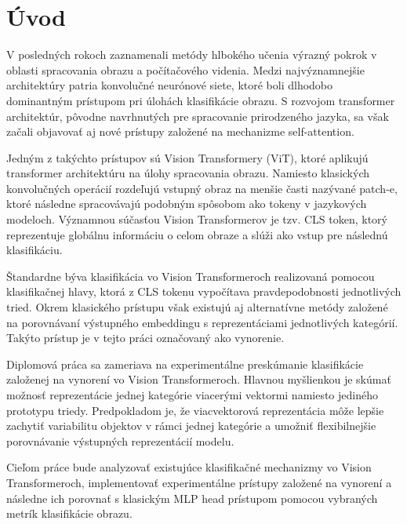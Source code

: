 \chapter*{Úvod} %

V posledných rokoch zaznamenali metódy hlbokého učenia výrazný pokrok v oblasti spracovania obrazu a počítačového videnia. Medzi najvýznamnejšie architektúry patria konvolučné neurónové siete, ktoré boli dlhodobo dominantným prístupom pri úlohách klasifikácie obrazu. S rozvojom transformer architektúr, pôvodne navrhnutých pre spracovanie prirodzeného jazyka, sa však začali objavovať aj nové prístupy založené na mechanizme self-attention.

Jedným z takýchto prístupov sú Vision Transformery (ViT), ktoré aplikujú transformer architektúru na úlohy spracovania obrazu. Namiesto klasických konvolučných operácií rozdeľujú vstupný obraz na menšie časti nazývané patch-e, ktoré následne spracovávajú podobným spôsobom ako tokeny v jazykových modeloch. Významnou súčasťou Vision Transformerov je tzv. CLS token, ktorý reprezentuje globálnu informáciu o celom obraze a slúži ako vstup pre následnú klasifikáciu.

Štandardne býva klasifikácia vo Vision Transformeroch realizovaná pomocou klasifikačnej hlavy, ktorá z CLS tokenu vypočítava pravdepodobnosti jednotlivých tried. Okrem klasického prístupu však existujú aj alternatívne metódy založené na porovnávaní výstupného embeddingu s reprezentáciami jednotlivých kategórií. Takýto prístup je v tejto práci označovaný ako vynorenie.

Diplomová práca sa zameriava na experimentálne preskúmanie klasifikácie založenej na vynorení vo Vision Transformeroch. Hlavnou myšlienkou je skúmať možnosť reprezentácie jednej kategórie viacerými vektormi namiesto jediného prototypu triedy. Predpokladom je, že viacvektorová reprezentácia môže lepšie zachytiť variabilitu objektov v rámci jednej kategórie a umožniť flexibilnejšie porovnávanie výstupných reprezentácií modelu.

Cieľom práce bude analyzovať existujúce klasifikačné mechanizmy vo Vision Transformeroch, implementovať experimentálne prístupy založené na vynorení a následne ich porovnať s klasickým MLP head prístupom pomocou vybraných metrík klasifikácie obrazu.


